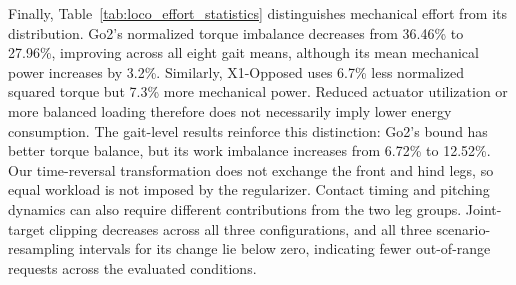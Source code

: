 Finally, Table~\ref{tab:loco_effort_statistics} distinguishes mechanical effort from its distribution. Go2's normalized torque imbalance decreases from 36.46\% to 27.96\%, improving across all eight gait means, although its mean mechanical power increases by 3.2\%. Similarly, X1-Opposed uses 6.7\% less normalized squared torque but 7.3\% more mechanical power. Reduced actuator utilization or more balanced loading therefore does not necessarily imply lower energy consumption. The gait-level results reinforce this distinction: Go2's bound has better torque balance, but its work imbalance increases from 6.72\% to 12.52\%. Our time-reversal transformation does not exchange the front and hind legs, so equal workload is not imposed by the regularizer. Contact timing and pitching dynamics can also require different contributions from the two leg groups. Joint-target clipping decreases across all three configurations, and all three scenario-resampling intervals for its change lie below zero, indicating fewer out-of-range requests across the evaluated conditions.
